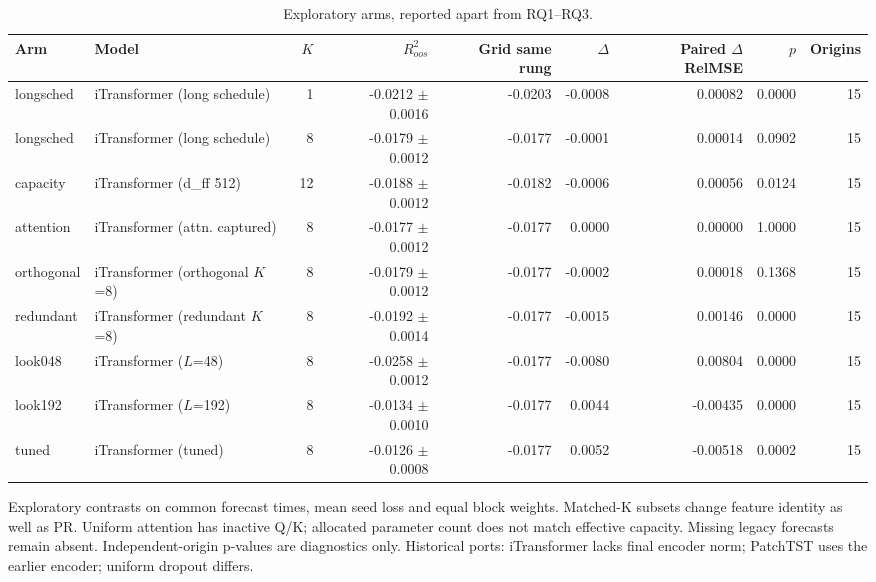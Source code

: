 \begin{table}[!t]
\centering
\caption{Exploratory arms, reported apart from RQ1--RQ3.}
\label{tab:robustness}
\begin{tabular}{llrrrrrrr}
\toprule
Arm & Model & $K$ & $R^2_{oos}$ & Grid same rung & $\Delta$ & Paired $\Delta$RelMSE & $p$ & Origins \\
\midrule
longsched & iTransformer (long schedule) & 1 & -0.0212 $\pm$ 0.0016 & -0.0203 & -0.0008 & 0.00082 & 0.0000 & 15 \\
longsched & iTransformer (long schedule) & 8 & -0.0179 $\pm$ 0.0012 & -0.0177 & -0.0001 & 0.00014 & 0.0902 & 15 \\
capacity & iTransformer (d\_ff 512) & 12 & -0.0188 $\pm$ 0.0012 & -0.0182 & -0.0006 & 0.00056 & 0.0124 & 15 \\
attention & iTransformer (attn. captured) & 8 & -0.0177 $\pm$ 0.0012 & -0.0177 & 0.0000 & 0.00000 & 1.0000 & 15 \\
orthogonal & iTransformer (orthogonal $K$=8) & 8 & -0.0179 $\pm$ 0.0012 & -0.0177 & -0.0002 & 0.00018 & 0.1368 & 15 \\
redundant & iTransformer (redundant $K$=8) & 8 & -0.0192 $\pm$ 0.0014 & -0.0177 & -0.0015 & 0.00146 & 0.0000 & 15 \\
look048 & iTransformer ($L$=48) & 8 & -0.0258 $\pm$ 0.0012 & -0.0177 & -0.0080 & 0.00804 & 0.0000 & 15 \\
look192 & iTransformer ($L$=192) & 8 & -0.0134 $\pm$ 0.0010 & -0.0177 & 0.0044 & -0.00435 & 0.0000 & 15 \\
tuned & iTransformer (tuned) & 8 & -0.0126 $\pm$ 0.0008 & -0.0177 & 0.0052 & -0.00518 & 0.0002 & 15 \\
\bottomrule
\end{tabular}
\vspace{2pt}\par\footnotesize Exploratory contrasts on common forecast times, mean seed loss and equal block weights. Matched-K subsets change feature identity as well as PR. Uniform attention has inactive Q/K; allocated parameter count does not match effective capacity. Missing legacy forecasts remain absent. Independent-origin p-values are diagnostics only. Historical ports: iTransformer lacks final encoder norm; PatchTST uses the earlier encoder; uniform dropout differs.
\end{table}
